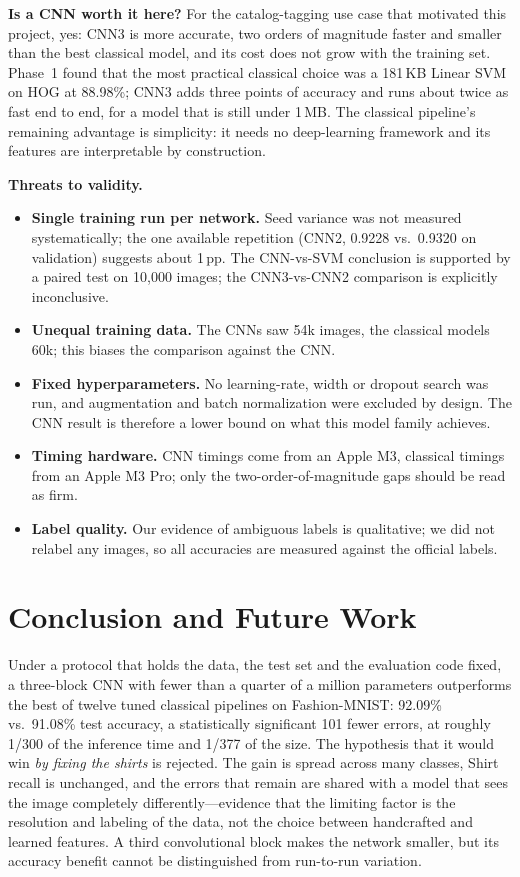 \documentclass[conference]{IEEEtran}
\newcommand{\pp}{\,pp}                       %
\begin{document}
\textbf{Is a CNN worth it here?} For the catalog-tagging use case that motivated this project, yes: CNN3 is more
accurate, two orders of magnitude faster and smaller than the best classical model, and its cost does not grow with the
training set. Phase~1 found that the most practical classical choice was a 181\,KB Linear SVM on HOG at 88.98\%; CNN3
adds three points of accuracy and runs about twice as fast end to end, for a model that is still under 1\,MB. The classical pipeline's remaining advantage is simplicity:
it needs no deep-learning framework and its features are interpretable by construction.

\textbf{Threats to validity.}
\begin{itemize}
  \item \textbf{Single training run per network.} Seed variance was not measured systematically; the one available
        repetition (CNN2, 0.9228 vs.\ 0.9320 on validation) suggests about 1\pp. The CNN-vs-SVM conclusion is supported by
        a paired test on 10{,}000 images; the CNN3-vs-CNN2 comparison is explicitly inconclusive.
  \item \textbf{Unequal training data.} The CNNs saw 54k images, the classical models 60k; this biases the comparison
        against the CNN.
  \item \textbf{Fixed hyperparameters.} No learning-rate, width or dropout search was run, and augmentation and batch
        normalization were excluded by design. The CNN result is therefore a lower bound on what this model family
        achieves.
  \item \textbf{Timing hardware.} CNN timings come from an Apple M3, classical timings from an Apple M3 Pro; only the
        two-order-of-magnitude gaps should be read as firm.
  \item \textbf{Label quality.} Our evidence of ambiguous labels is qualitative; we did not relabel any images, so all
        accuracies are measured against the official labels.
\end{itemize}

\section{Conclusion and Future Work}
\label{sec:conclusion}
Under a protocol that holds the data, the test set and the evaluation code fixed, a three-block CNN with fewer than a
quarter of a million parameters outperforms the best of twelve tuned classical pipelines on Fashion-MNIST: 92.09\% vs.\
91.08\% test accuracy, a statistically significant 101 fewer errors, at roughly 1/300 of the inference time and 1/377 of
the size. The hypothesis that it would win \emph{by fixing the shirts} is rejected. The gain is spread across many
classes, Shirt recall is unchanged, and the errors that remain are shared with a model that sees the image completely
differently---evidence that the limiting factor is the resolution and labeling of the data, not the choice between
handcrafted and learned features. A third convolutional block makes the network smaller, but its accuracy benefit
cannot be distinguished from run-to-run variation.
\end{document}
